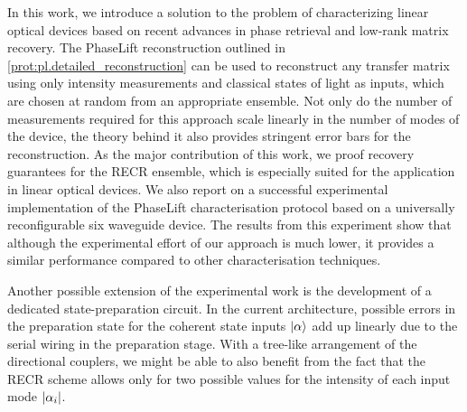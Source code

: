 In this work, we introduce a solution to the problem of characterizing linear optical devices based on recent advances in phase retrieval and low-rank matrix recovery.
The PhaseLift reconstruction outlined in \cref{prot:pl.detailed_reconstruction} can be used to reconstruct any transfer matrix using only intensity measurements and classical states of light as inputs, which are chosen at random from an appropriate ensemble.
Not only do the number of measurements required for this approach scale linearly in the number of modes of the device, the theory behind it also provides stringent error bars for the reconstruction.
As the major contribution of this work, we proof recovery guarantees for the RECR ensemble, which is especially suited for the application in linear optical devices.
We also report on a successful experimental implementation of the PhaseLift characterisation protocol based on a universally reconfigurable six waveguide device.
The results from this experiment show that although the experimental effort of our approach is much lower, it provides a similar performance compared to other characterisation techniques.

Another possible extension of the experimental work is the development of a dedicated state-preparation circuit.
In the current architecture, possible errors in the preparation state for the coherent state inputs $\ket{\alpha}$ add up linearly due to the serial wiring in the preparation stage.
With a tree-like arrangement of the directional couplers, we might be able to also benefit from the fact that the RECR scheme allows only for two possible values for the intensity of each input mode ${\vert\alpha_i\vert}$.
